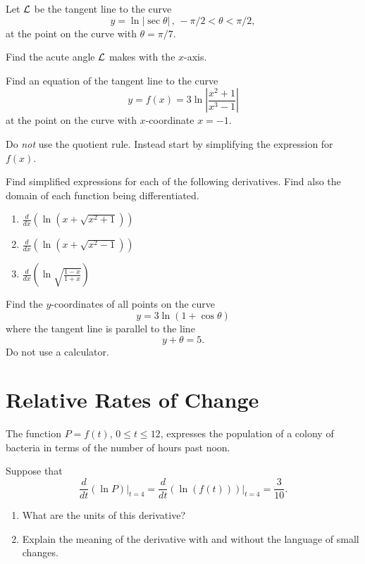 \documentclass{ximera}
\begin{document}
\begin{question}  \label{Q435rtrtgfgfg}
Let ${\cal L}$ be the tangent line to the curve
\[
    y = \ln \left| \sec \theta  \right| \, , \, -\pi/2 < \theta < \pi/2 ,
\]
at the point on the curve with $\theta=\pi/7$.

Find the acute angle ${\cal L}$ makes with the $x$-axis.
\end{question}

\begin{question} \label{Qhjklghvbnm}
Find an equation of the tangent line to the curve
\[
    y = f(x) = 3\ln \left| \frac{x^2+1}{x^3-1} \right|
\]
at the point on the curve with $x$-coordinate $x=-1$.

Do \emph{not} use the quotient rule. Instead start by simplifying the expression for $f(x)$.
\end{question}


\begin{question} \label{Qpf3r033dvf}
Find simplified expressions for each of the following derivatives. Find also the domain of each function being differentiated.

\begin{enumerate}
\item $\frac{d}{dx} \left( \ln\left(x+\sqrt{x^{2}+1}\right) \right)$

\item $\frac{d}{dx} \left( \ln\left(x+\sqrt{x^{2}-1}\right) \right)$

\item $\frac{d}{dx} \left( \ln  \sqrt{\frac{1-x}{1+x}} \right)$
\end{enumerate}
 
\end{question}


\begin{question} \label{Q89fghvbnm}
Find the $y$-coordinates of all points on the curve
\[
    y = 3\ln \left( 1 + \cos\theta \right)
\]
where the tangent line is parallel to the line 
\[
      y+\theta = 5. 
\]
Do not use a calculator.
\end{question}

\section{Relative Rates of Change}

\begin{question}  \label{Qghlvmnvngng}
The function $P=f(t)$, $0\leq t \leq 12$, expresses the population of a colony of bacteria in terms of the number of hours past noon.

Suppose that
\[
   \frac{d}{dt} \left(  \ln P \right)\Big|_{t=4} = \frac{d}{dt} \left(  \ln (f(t)) \right)\Big|_{t=4}  = \frac{3}{10} .
\]

\begin{enumerate}
\item What are the units of this derivative?

\item Explain the meaning of the derivative with and without the language of small changes.
\end{enumerate}
\end{question}
\end{document}
